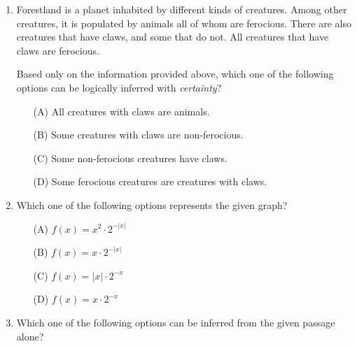 \documentclass[journal]{IEEEtran}
\begin{document}
\begin{enumerate}
\item 
Forestland is a planet inhabited by different kinds of creatures. Among other creatures, it is populated by animals all of whom are ferocious. There are also creatures that have claws, and some that do not. All creatures that have claws are ferocious.



Based only on the information provided above, which one of the following options can be logically inferred with \textit{certainty}?

\hfill{}

\begin{enumerate}
    \item[(A)] All creatures with claws are animals.
    \item[(B)] Some creatures with claws are non-ferocious.
    \item[(C)] Some non-ferocious creatures have claws.
    \item[(D)] Some ferocious creatures are creatures with claws.
\end{enumerate}

\item 
Which one of the following options represents the given graph?

\hfill{}

\begin{center}
\end{center}

\begin{enumerate}
    \item[(A)] \( f(x) = x^2 \cdot 2^{-|x|} \)
    \item[(B)] \( f(x) = x \cdot 2^{-|x|} \)
    \item[(C)] \( f(x) = |x| \cdot 2^{-x} \)
    \item[(D)] \( f(x) = x \cdot 2^{-x} \)
     \end{enumerate}
     \hfill{}
     
  \item 
Which one of the following options can be inferred from the given passage alone?


\end{enumerate}
\end{document}
